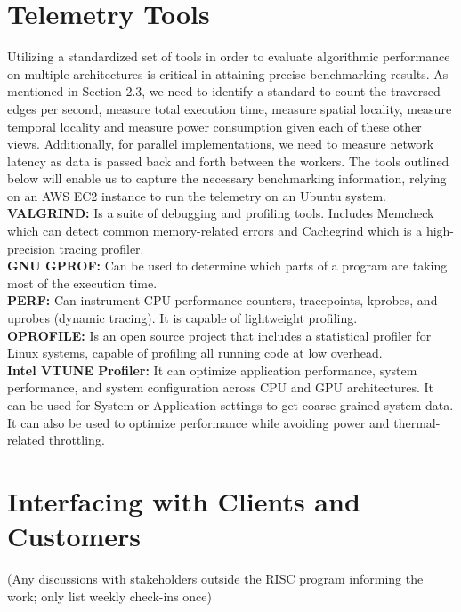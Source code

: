 \documentclass[letterpaper, 10pt]{article}
\begin{document}
\begin{multicols}{2}
    \section{Telemetry Tools}
        Utilizing a standardized set of tools in order to evaluate algorithmic performance on multiple architectures is critical in attaining precise benchmarking results. As mentioned in Section 2.3, we need to identify a standard to count the traversed edges per second, measure total execution time, measure spatial locality, measure temporal locality and measure power consumption given each of these other views. Additionally, for parallel implementations, we need to measure network latency as data is passed back and forth between the workers. The tools outlined below will enable us to capture the necessary benchmarking information, relying on an AWS EC2 instance to run the telemetry on an Ubuntu system. \\
        \noindent
        \newline
        \textbf{VALGRIND:}
         Is a suite of debugging and profiling tools. Includes Memcheck which can detect common memory-related errors and Cachegrind which is a high-precision tracing profiler. \\  
        \noindent
        \newline
        \textbf{GNU GPROF:}  Can be used to determine which parts of a program are taking most of the execution time. \\
        \noindent
        \newline
        \textbf{PERF:}  Can instrument CPU performance counters, tracepoints, kprobes, and uprobes (dynamic tracing). It is capable of lightweight profiling. \\
        \noindent
        \newline
        \textbf{OPROFILE:}  Is an open source project that includes a statistical profiler for Linux systems, capable of profiling all running code at low overhead.\\
        \noindent
        \newline
        \textbf{Intel VTUNE Profiler:} It can optimize application performance, system performance, and system configuration across CPU and GPU architectures. It can be used for System or Application settings to get coarse-grained system data. It can also be used to optimize performance while avoiding power and thermal-related throttling. \\
       
    \section{Interfacing with Clients and Customers}
        (Any discussions with stakeholders outside the RISC  program informing the work; only list weekly check-ins  once) \\
        

\end{multicols}
\end{document}
